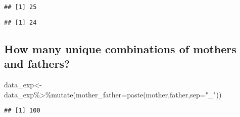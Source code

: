 \documentclass[
]{article}
\newenvironment{Shaded}{\begin{snugshade}}{\end{snugshade}}
\newcommand{\AttributeTok}[1]{\textcolor[rgb]{0.77,0.63,0.00}{#1}}
\newcommand{\CommentTok}[1]{\textcolor[rgb]{0.56,0.35,0.01}{\textit{#1}}}
\newcommand{\FunctionTok}[1]{\textcolor[rgb]{0.00,0.00,0.00}{#1}}
\newcommand{\NormalTok}[1]{#1}
\newcommand{\OtherTok}[1]{\textcolor[rgb]{0.56,0.35,0.01}{#1}}
\newcommand{\SpecialCharTok}[1]{\textcolor[rgb]{0.00,0.00,0.00}{#1}}
\newcommand{\StringTok}[1]{\textcolor[rgb]{0.31,0.60,0.02}{#1}}
\begin{document}
\begin{Shaded}
\end{Shaded}

\begin{verbatim}
## [1] 25
\end{verbatim}

\begin{Shaded}
\end{Shaded}

\begin{verbatim}
## [1] 24
\end{verbatim}

\hypertarget{how-many-unique-combinations-of-mothers-and-fathers}{%
\subsection{How many unique combinations of mothers and
fathers?}\label{how-many-unique-combinations-of-mothers-and-fathers}}

\begin{Shaded}
\begin{Highlighting}[]
\NormalTok{data\_exp}\OtherTok{\textless{}{-}}\NormalTok{data\_exp}\SpecialCharTok{\%\textgreater{}\%}\FunctionTok{mutate}\NormalTok{(}\AttributeTok{mother\_father=}\FunctionTok{paste}\NormalTok{(mother,father,}\AttributeTok{sep=}\StringTok{"\_"}\NormalTok{))}
\end{Highlighting}
\end{Shaded}

\begin{Shaded}
\end{Shaded}

\begin{verbatim}
## [1] 100
\end{verbatim}
\end{document}
